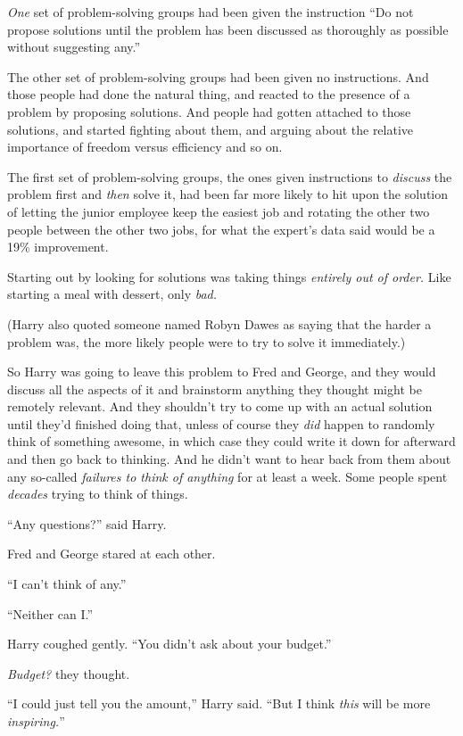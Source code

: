 \emph{One} set of problem-solving groups had been given the instruction
``Do not propose solutions until the problem has been discussed as
thoroughly as possible without suggesting any.''

The other set of problem-solving groups had been given no instructions.
And those people had done the natural thing, and reacted to the presence
of a problem by proposing solutions. And people had gotten attached to
those solutions, and started fighting about them, and arguing about the
relative importance of freedom versus efficiency and so on.

The first set of problem-solving groups, the ones given instructions to
\emph{discuss} the problem first and \emph{then} solve it, had been far
more likely to hit upon the solution of letting the junior employee keep
the easiest job and rotating the other two people between the other two
jobs, for what the expert's data said would be a 19\% improvement.

Starting out by looking for solutions was taking things \emph{entirely
out of order.} Like starting a meal with dessert, only \emph{bad.}

(Harry also quoted someone named Robyn Dawes as saying that the harder a
problem was, the more likely people were to try to solve it
immediately.)

So Harry was going to leave this problem to Fred and George, and they
would discuss all the aspects of it and brainstorm anything they thought
might be remotely relevant. And they shouldn't try to come up with an
actual solution until they'd finished doing that, unless of course they
\emph{did} happen to randomly think of something awesome, in which case
they could write it down for afterward and then go back to thinking. And
he didn't want to hear back from them about any so-called \emph{failures
to think of anything} for at least a week. Some people spent
\emph{decades} trying to think of things.

``Any questions?'' said Harry.

Fred and George stared at each other.

``I can't think of any.''

``Neither can I.''

Harry coughed gently. ``You didn't ask about your budget.''

\emph{Budget?} they thought.

``I could just tell you the amount,'' Harry said. ``But I think
\emph{this} will be more \emph{inspiring.}''

